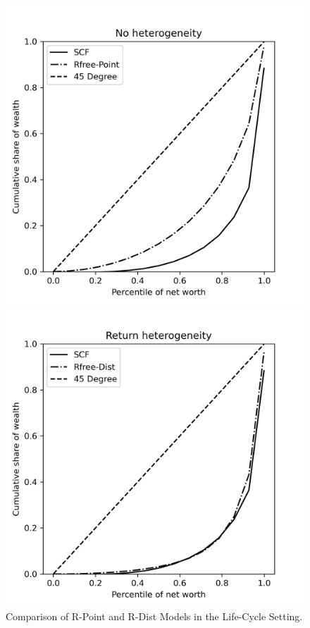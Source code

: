 \begin{figure}[h]
    \centering
    \begin{minipage}{0.48\textwidth}
        \centering
        \includegraphics[width=\textwidth]{../Figures/Unif_LCrrPointNetWorth_2004Plot.png}
    \end{minipage}
    \hfill
    \begin{minipage}{0.48\textwidth}
        \centering
        \includegraphics[width=\textwidth]{../Figures/Unif_LCrrDistNetWorth_2004Plot.png}
    \end{minipage}
    \caption{Comparison of R-Point and R-Dist Models in the Life-Cycle Setting.}
    \label{fig:LCUnif} 
  \end{figure}


